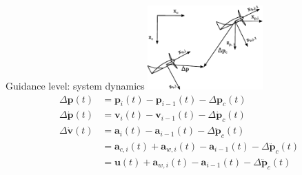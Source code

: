 \documentclass[12pt,svgnames,table,draft=false]{beamer}
\newcommand{\mbf}[1]{\mathbf{#1}}
\providecommand{\mbf}[1]{\mathbf{#1}}
\newcommand{\idxFollower}{{\ensuremath{i} }}
\newcommand{\idxPredecessor}{{\ensuremath{i-1} }}
\begin{document}
\begin{frame}{Guidance level: system dynamics}
\centering
\includegraphics[width=4.4cm]{frames.pdf}    %
\begin{align}
\Delta \mbf{p}(t) &= \mbf{p}_\idxFollower(t) - \mbf{p}_\idxPredecessor(t) - \Delta \mbf{p}_c(t)  \nonumber \\
\Delta \dot{\mbf{p}}(t) &= \mbf{v}_{\idxFollower}(t) - \mbf{v}_{\idxPredecessor}(t) -  \Delta \dot{\mbf{p}}_c(t) \nonumber \\
\Delta \dot{\mbf{v}}(t) &= \mbf{a}_\idxFollower(t) - \mbf{a}_\idxPredecessor(t) -  \Delta \ddot{\mbf{p}}_c(t) \nonumber \\
{} &= \mbf{a}_{c,\idxFollower}(t) + \mbf{a}_{w,\idxFollower}(t)
 - \mbf{a}_\idxPredecessor(t) -  \Delta \ddot{\mbf{p}}_c(t) \nonumber \\
{} &= \mbf{u}(t) + \mbf{a}_{w,\idxFollower}(t)
 - \mbf{a}_\idxPredecessor(t) -  \Delta \ddot{\mbf{p}}_c(t) \nonumber
\end{align}
\end{frame}


\end{document}
